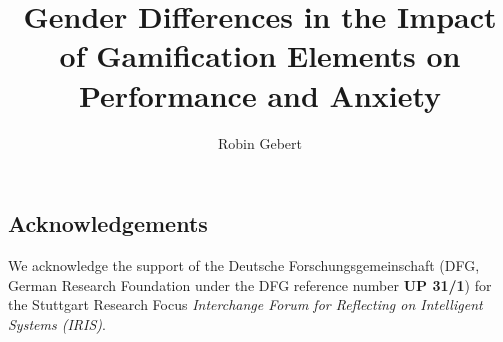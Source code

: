 \documentclass[stu, floatsintext, helv]{apa7}
\title{Gender Differences in the Impact of Gamification Elements on Performance and Anxiety}
\author{Robin Gebert}
\begin{document}
\maketitle









\subsection*{Acknowledgements}
We acknowledge the support of the Deutsche Forschungsgemeinschaft (DFG, German Research Foundation under the DFG reference number \textbf{UP 31/1}) for the Stuttgart Research Focus \textit{Interchange Forum for Reflecting on Intelligent Systems (IRIS)}.

\printbibliography
\end{document}
